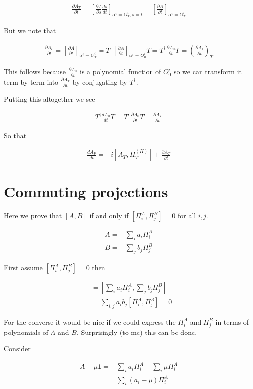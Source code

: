 \documentclass[12pt]{article}
\newcommand{\ddt}[1]{\frac{d #1}{dt}}
\newcommand{\ppt}[1]{\frac{\partial #1}{\partial t}}
\newcommand{\bv}[1]{\boldsymbol{#1}}
\begin{document}
\begin{align}
\ppt{A_T} = \left[\frac{\partial A}{\partial s} \ddt{s}\right]_{\alpha^i=O_T^i,s=t} = \left[\ppt{A} \right]_{\alpha^i = O_T^i}
\end{align}

But we note that

\begin{align}
\ppt{A_T} = \left[\ppt{A} \right]_{\alpha^i=O_T^i} = T^{\dag} \left[\ppt{A} \right]_{\alpha^i = O_0^i} T = T^{\dag} \ppt{A_0} T = \left(\ppt{A_0}\right)_T
\end{align}

This follows because $\ppt{A_0}$ is a polynomial function of $O_0^i$ so we can transform it term by term into $\ppt{A_T}$ by conjugating by $T^{\dag}$.

Putting this altogether we see

\begin{align}
T^{\dag}\ddt{A_0}T = T^{\dag}\ppt{A_0}T = \ppt{A_T}
\end{align}

So that

\begin{align}
\ddt{A_P} = -i[A_T,H_T^{(H)}] + \ppt{A_T}
\end{align}

\section{Commuting projections}

Here we prove that $[A, B]$ if and only if $[\Pi^A_i, \Pi^B_j] = 0$ for all $i, j$.

\begin{align}
A =& \sum_i a_i \Pi^A_i \nonumber\\
B =& \sum_j b_j \Pi^B_j
\end{align}

First assume $[\Pi^A_i, \Pi^B_j] = 0$ then

\begin{align}
[A, B] &= \left[\sum_i a_i \Pi^A_i, \sum_j b_j \Pi^B_j\right]\\
&= \sum_{i, j} a_i b_j [\Pi^A_i, \Pi^B_j] = 0
\end{align}

For the converse it would be nice if we could express the $\Pi^A_i$ and $\Pi^B_j$ in terms of polynomials of $A$ and $B$. 
Surprisingly (to me) this can be done.

Consider

\begin{align}
A - \mu \bv{1} =& \sum_i a_i \Pi^A_i - \sum_i \mu \Pi^A_i \nonumber\\
=& \sum_i (a_i - \mu) \Pi^A_i
\end{align}
\end{document}
